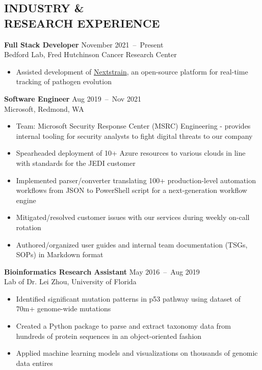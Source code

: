 \documentclass[line,resmargin]{res}
\begin{document}
\address{\href{mailto:victor@victorl.in}{victor@victorl.in} $|$
         \href{https://victorl.in/}{https://victorl.in/}}

\begin{resume}

\section{INDUSTRY \& \\ RESEARCH EXPERIENCE}
    \textbf{Full Stack Developer}    \hfill November 2021~--~Present \\
    Bedford Lab, Fred Hutchinson Cancer Research Center
    \begin{itemize}  \itemsep -2pt
        \item Assisted development of \href{https://nextstrain.org/}{Nextstrain}, an open-source platform for real-time tracking of pathogen evolution
    \end{itemize}

    \textbf{Software Engineer}    \hfill Aug 2019~--~Nov 2021 \\
    Microsoft, Redmond, WA
    \begin{itemize}  \itemsep -2pt
        \item Team: Microsoft Security Response Center (MSRC) Engineering - provides internal tooling for security analysts to fight digital threats to our company
        \item Spearheaded deployment of 10+ Azure resources to various clouds in line with standards for the JEDI customer
        \item Implemented parser/converter translating 100+ production-level automation workflows from JSON to PowerShell script for a next-generation workflow engine
        \item Mitigated/resolved customer issues with our services during weekly on-call rotation
        \item Authored/organized user guides and internal team documentation (TSGs, SOPs) in Markdown format
    \end{itemize}

    \textbf{Bioinformatics Research Assistant}    \hfill May 2016~--~Aug 2019 \\
    Lab of Dr. Lei Zhou, University of Florida
    \begin{itemize}  \itemsep -2pt
        \item Identified significant mutation patterns in p53 pathway using dataset of 70m+ genome-wide mutations
        \item Created a Python package to parse and extract taxonomy data from hundreds of protein sequences in an object-oriented fashion
        \item Applied machine learning models and visualizations on thousands of genomic data entires
    \end{itemize}


\end{resume}
\end{document}
